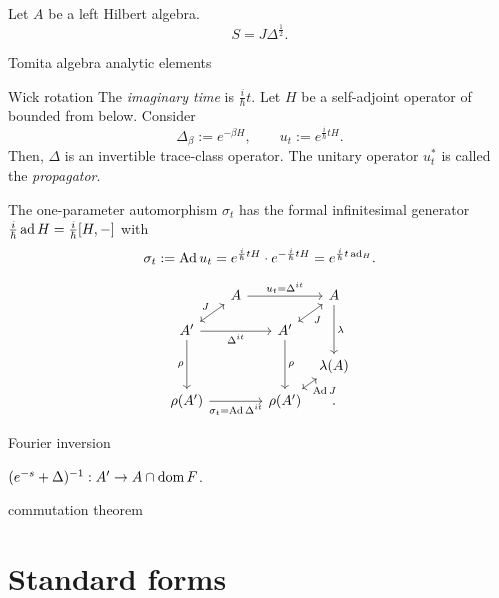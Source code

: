 \documentclass{../../large}
\begin{document}
\begin{prb}
Let $A$ be a left Hilbert algebra.
\[S=J\Delta^{\frac12}.\]

Tomita algebra
analytic elements
\end{prb}


\begin{prb}
Wick rotation
The \emph{imaginary time} is $\frac i\hbar t$.
Let $H$ be a self-adjoint operator of bounded from below.
Consider
\[\Delta_\beta:=e^{-\beta H},\qquad u_t:=e^{\frac i\hbar tH}.\]
Then, $\Delta$ is an invertible trace-class operator.
The unitary operator $u_t^*$ is called the \emph{propagator}.


The one-parameter automorphism $\sigma_t$ has the formal infinitesimal generator $\frac i\hbar\operatorname{ad} H=\frac i\hbar[H,-]$ with
\[\sigma_t:=\operatorname{Ad} u_t=e^{\frac i\hbar tH}\cdot e^{-\frac i\hbar tH}=e^{\frac i\hbar t\operatorname{ad}_H}.\]

\[\begin{tikzcd}[column sep={3.5em,between origins},row sep={2.5em,between origins}]
&A\ar{rr}{u_t=\Delta^{it}}&&A\ar{dd}{\lambda}\\
A'\ar[<->]{ur}{J}\ar[swap]{rr}{\Delta^{it}}\ar[swap]{dd}{\rho}&&A'\ar[<->,swap]{ur}{J}\ar{dd}{\rho}&\\
&&&\lambda(A)\\
\rho(A')\ar[swap]{rr}{\sigma_t=\Ad\Delta^{it}}&&\rho(A')\ar[<->,swap]{ur}{\Ad J}&.
\end{tikzcd}\]
\begin{parts}
\item Fourier inversion
\item $(e^{-s}+\Delta)^{-1}:A'\to A\cap\operatorname{dom} F$.
\item commutation theorem
\end{parts}
\end{prb}





\section{Standard forms}
\end{document}
